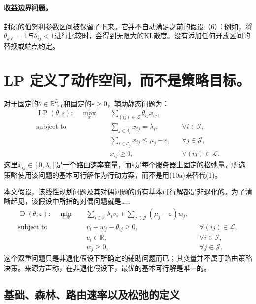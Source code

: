 \documentclass{article}
\begin{document}
\paragraph{收益边界问题。}
封闭的伯努利参数区间被保留了下来。它并不自动满足之前的假设（6）：例如，将$\theta_{k\ell}=1$与$\theta_{ij}<1$进行比较时，会得到无限大的KL散度。没有添加任何开放区间的替换或端点约定。

\section*{LP 定义了动作空间，而不是策略目标。}

对于固定的$\theta\in\mathbb R_{\geq0}^{L}$和固定的$\varepsilon\geq0$，辅助静态问题为：
\begin{align}
\operatorname{LP}(\theta,\varepsilon):\quad
\max_x\quad&\sum_{(ij)\in\mathcal L}\theta_{ij}x_{ij},\tag{10a}\\
\text{subject to}\quad
&\sum_{j\in\mathcal S_i}x_{ij}=\lambda_i,
&&\forall i\in\mathcal I,\tag{10b}\\
&\sum_{i\in\mathcal C_j}x_{ij}\leq\mu_j-\varepsilon,
&&\forall j\in\mathcal J,\tag{10c}\\
&x_{ij}\geq0,
&&\forall(ij)\in\mathcal L.\tag{10d}
\end{align}
这里$x_{ij}\in[0,\lambda_i]$是一个路由速率变量，而$\varepsilon$是每个服务器上固定的松弛量。所选策略使用该问题的基本可行解作为行动方案，而不是用(10a)来替代(1)。

本文假设，该线性规划问题及其对偶问题的所有基本可行解都是非退化的。为了清晰起见，该假设中所指的对偶问题就是……
\begin{align}
\operatorname D(\theta,\varepsilon):\quad
\min_{v,w}\quad&\sum_{i\in\mathcal I}\lambda_i v_i+
\sum_{j\in\mathcal J}(\mu_j-\varepsilon)w_j,\tag{16a}\\
\text{subject to}\quad&v_i+w_j-\theta_{ij}\geq0,
&&\forall(ij)\in\mathcal L,\tag{16b}\\
&v_i\in\mathbb R,&&\forall i\in\mathcal I,\tag{16c}\\
&w_j\geq0,&&\forall j\in\mathcal J.\tag{16d}
\end{align}
这个双重问题只是非退化假设下所确定的辅助问题而已；其变量并不属于路由策略决策。来源方声称，在非退化假设下，最优的基本可行解是唯一的。

\subsection*{基础、森林、路由速率以及松弛的定义}
\end{document}
